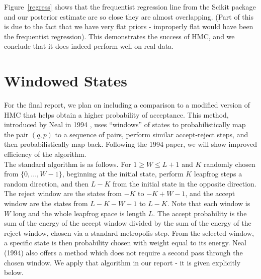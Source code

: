 \documentclass{article}
\numberwithin{equation}{section}
\begin{document}
Figure~\ref{regress} shows that the frequentist regression line from the Scikit package and our posterior estimate are so close they are almost overlapping. (Part of this is due to the fact that we have very flat priors - improperly flat would have been the frequentist regression). This demonstrates the success of HMC, and we conclude that it does indeed perform well on real data.


\section{Windowed States}
For the final report, we plan on including a comparison to a modified version of HMC that helps obtain a higher probability of acceptance. This method, introduced by Neal in 1994 \cite{neal_94}, uses ``windows'' of states to probabilistically map the pair $(q,p)$ to a sequence of pairs, perform similar accept-reject steps, and then probabilistically map back. Following the 1994 paper, we will show improved efficiency of the algorithm.\\

The standard algorithm is as follows. For $1 \geq W \leq L + 1$ and $K$ randomly chosen from $\{0,...,W-1\}$, beginning at the initial state, perform $K$ leapfrog steps a random direction, and then $L - K$ from the initial state in the opposite direction. The reject window are the states from $-K$ to $-K + W - 1$, and the accept window are the states from $L-K-W+1$ to $L-K$. Note that each window is $W$ long and the whole leapfrog space is length $L$. The accept probability is the sum of the energy of the accept window divided by the sum of the energy of the reject window, chosen via a standard metropolis step. From the selected window, a specific state is then probability chosen with weight equal to its energy. Neal (1994)\cite{neal_94} also offers a method which does not require a second pass through the chosen window. We apply that algorithm in our report - it is given explicitly below.\\
\end{document}
